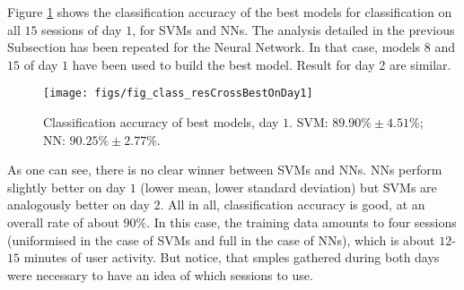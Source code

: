 Figure \ref{fig:best_class} shows the classification accuracy of
the best models for classification on all $15$ sessions of day
$1$, for SVMs and NNs. The analysis detailed in the previous
Subsection has been repeated for the Neural Network. In that case,
models $8$ and $15$ of day $1$ have been used to build the best
model. Result for day 2 are similar.

\begin{figure} \centering
    \texttt{[image: figs/fig\_class\_resCrossBestOnDay1]} \\
  \caption{Classification accuracy of best models, day $1$. SVM: $89.90\% \pm 4.51\%$;
    NN: $90.25\% \pm 2.77\%$.}
  \label{fig:best_class}
\end{figure}

As one can see, there is no clear winner between SVMs and NNs. NNs
perform slightly better on day $1$ (lower mean, lower standard
deviation) but SVMs are analogously better on day $2$. All in all,
classification accuracy is good, at an overall rate of about
$90\%$. In this case, the training data amounts to four sessions
(uniformised in the case of SVMs and full in the case of NNs), which
is about $12$-$15$ minutes of user activity. But notice, that smples
gathered during both days were necessary to have an idea of which
sessions to use.
